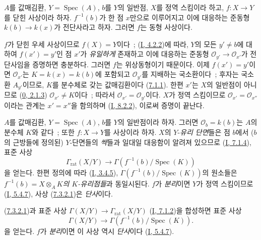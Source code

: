 \begin{proposition}[7.3.1]
\label{II.7.3.1-ko}
$A$를 값매김환, $Y=\operatorname{Spec}(A)$, $b$를 $Y$의 일반점,
$X$를 정역 스킴이라 하고, $f:X\to Y$를 닫힌 사상이라 하자. $f^{-1}(b)$가
한 점 $x$만으로 이루어지고 이에 대응하는 준동형
$k(b)\to k(x)$가 전단사라고 하자. 그러면 $f$는 동형 사상이다.
\end{proposition}

$f$가 닫힌 우세 사상이므로 $f(X)=Y$이다~;
(\hyperref[I.4.2.2-ko]{I, 4.2.2})에 따라, $Y$의 모든 $y'\neq b$에 대하여
$f(x')=y'$인 점 $x'$가 \emph{유일하게} 존재하고 이에 대응하는 준동형
$\mathcal{O}_{y'}\to\mathcal{O}_{x'}$가 전단사임을 증명하면 충분하다. 그러면
$f$는 위상동형이기 때문이다. 이제 $f(x')=y'$이면 $\mathcal{O}_{x'}$는
$K=k(x)=k(b)$에 포함되고 $\mathcal{O}_{y'}$를 지배하는 국소환이다~; 후자는
국소환 $A_{y'}$이므로, $K$를 분수체로 갖는 값매김환이다
(\hyperref[II.7.1.1-ko]{7.1.1}). 한편 $x'$는 $X$의 일반점이 아니므로
(\hyperref[0.2.1.3-ko]{0, 2.1.3}) $\mathcal{O}_{x'}\neq K$이다~; 따라서
$\mathcal{O}_{x'}=\mathcal{O}_{y'}$이다. $X$가 정역 스킴이므로
$\mathcal{O}_{x'}=\mathcal{O}_{x''}$이라는 관계는 $x'=x''$을 함의하며
(\hyperref[I.8.2.2-ko]{I, 8.2.2}), 이로써 증명이 끝난다.

\begin{env}[7.3.2]
\label{II.7.3.2-ko}
$A$를 값매김환, $Y=\operatorname{Spec}(A)$, $b$를 $Y$의 일반점이라 하자.
그러면 $\mathcal{O}_b=k(b)$는 $A$의 분수체 $K$와 같다~; 또한
$f:X\to Y$를 사상이라 하자. $X$의 $Y$-\emph{유리 단면}들은 점 $b$에서
($b$의 근방들에 정의된) $Y$-단면들의 \emph{싹}들과 일대일 대응함이
알려져 있으므로 (\hyperref[I.7.1.4-ko]{I, 7.1.4}), 표준 사상
\[
\tag{7.3.2.1}
\label{II.7.3.2.1-ko}
\Gamma_{\mathrm{rat}}(X/Y)\longrightarrow
\Gamma(f^{-1}(b)/\operatorname{Spec}(K))
\]
을 얻는다. 한편 정의에 따라 (\hyperref[I.3.4.5-ko]{I, 3.4.5}),
$\Gamma(f^{-1}(b)/\operatorname{Spec}(K))$의 원소들은
\emph{$f^{-1}(b)=X\otimes_AK$의 $K$-유리점들}과 동일시된다.
$f$가 \emph{분리}이면 $Y$가 정역 스킴이므로
(\hyperref[I.5.4.7-ko]{I, 5.4.7}), 사상
(\hyperref[II.7.3.2.1-ko]{7.3.2.1})은 \emph{단사}이다.

(\hyperref[II.7.3.2.1-ko]{7.3.2.1})과 표준 사상
$\Gamma(X/Y)\to\Gamma_{\mathrm{rat}}(X/Y)$
(\hyperref[I.7.1.2-ko]{I, 7.1.2})을 합성하면 표준 사상
\[
\tag{7.3.2.2}
\label{II.7.3.2.2-ko}
\Gamma(X/Y)\longrightarrow \Gamma(f^{-1}(b)/\operatorname{Spec}(K)).
\]
을 얻는다. $f$가 \emph{분리}이면 이 사상 역시 \emph{단사}이다
(\hyperref[I.5.4.7-ko]{I, 5.4.7}).
\end{env}


